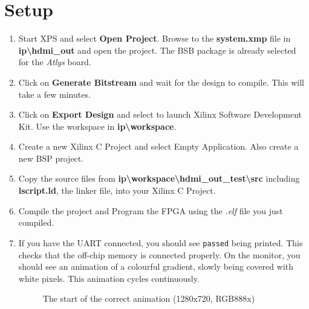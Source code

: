 \documentclass[12pt]{article}
\begin{document}
  \section{Setup}
  \begin{enumerate}
    \item Start XPS and select \textbf {Open Project}. Browse to the \textbf {system.xmp} file in \textbf {ip\textbackslash{}hdmi\_out} and open the project. The BSB package is already selected for the \textit {Atlys} board.
    \item Click on \textbf {Generate Bitstream} and wait for the design to compile. This will take a few minutes.
    \item Click on \textbf {Export Design} and select to launch Xilinx Software Development Kit. Use the workspace in \textbf {ip\textbackslash{}workspace}.
    \item Create a new Xilinx C Project and select Empty Application. Also create a new BSP project.
    \item Copy the source files from \textbf {ip\textbackslash{}workspace\textbackslash{}hdmi\_out\_test\textbackslash{}src} including \textbf {lscript.ld}, the linker file, into your Xilinx C Project.
    \item Compile the project and Program the FPGA using the \textit {.elf} file you just compiled.
    \item If you have the UART connected, you should see \texttt {passed} being printed. This checks that the off-chip memory is connected properly. On the monitor, you should see an animation of a colourful gradient, slowly being covered with white pixels. This animation cycles continuously.
      \begin{figure}[h!]
        \centering
        \caption{The start of the correct animation (1280x720, RGB888x)}

\end{figure}
\end{enumerate}
\end{document}
